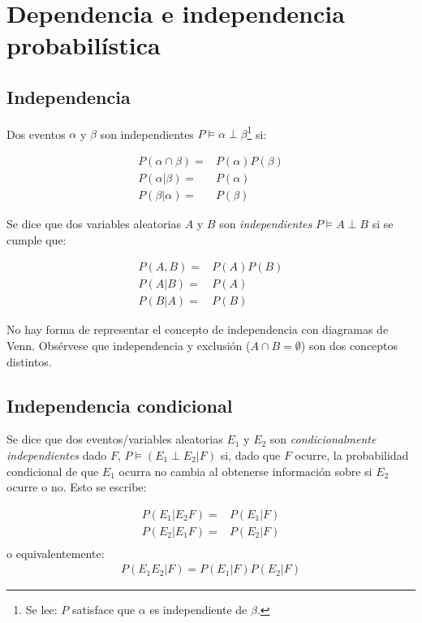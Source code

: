 \chapter[Independencia]{Dependencia e independencia probabilística}

\section{Independencia}

Dos eventos $\alpha$ y $\beta$ son independientes $P \models \alpha \perp \beta$\footnote{Se lee: $P$ satisface que $\alpha$ es independiente de $\beta$.} si:

\begin{align}
 P(\alpha \cap \beta) =& P(\alpha)P(\beta) \\
 P(\alpha|\beta) =& P(\alpha) \\
 P(\beta|\alpha) =& P(\beta)
\end{align}

Se dice que dos variables aleatorias $A$ y $B$ son \emph{independientes} $P \models A \perp B$ si se cumple que:

\begin{align}
 P(A,B) =& P(A)P(B) \\
 P(A|B) =& P(A) \\
 P(B|A) =& P(B)
\end{align}

No hay forma de representar el concepto de independencia con diagramas de Venn.  Obsérvese que independencia y exclusión ($A \cap B = \emptyset$) son dos conceptos distintos.

\section{Independencia condicional}

Se dice que dos eventos/variables aleatorias $E_1$ y $E_2$ son \emph{condicionalmente independientes} dado $F$, $P \models (E_1 \perp E_2 | F)$ si, dado que $F$ ocurre, la probabilidad condicional de que $E_1$ ocurra no cambia al obtenerse información sobre si $E_2$ ocurre o no.  Esto se escribe:

\begin{align}
 P(E_1|E_2F) =& P(E_1|F) \\
 P(E_2|E_1F) =& P(E_2|F) \\
\end{align}
o equivalentemente:
\begin{align}
 P(E_1E_2|F) = P(E_1|F)P(E_2|F)
\end{align}

